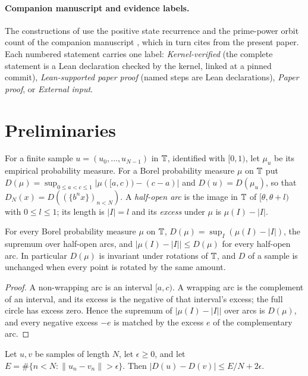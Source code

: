 \documentclass[11pt]{article}
\newcommand{\dist}[1]{\lVert #1\rVert}
\newcommand{\fr}[1]{\{#1\}}
\begin{document}
\paragraph{Companion manuscript and evidence labels.}
The constructions of  use the positive state recurrence and the prime-power
orbit count of the companion manuscript \cite{CompanionC}, which in turn cites 
from the present paper. Each numbered statement carries one label: \emph{Kernel-verified} (the
complete statement is a Lean declaration checked by the kernel, linked at a pinned commit),
\emph{Lean-supported paper proof} (named steps are Lean declarations), \emph{Paper proof}, or
\emph{External input}.

\section{Preliminaries}\label{sec:prelim}

For a finite sample $u=(u_0,\ldots,u_{N-1})$ in $\mathbb T$, identified with $[0,1)$, let $\mu_u$ be its
empirical probability measure. For a Borel probability measure $\mu$ on $\mathbb T$ put
$D(\mu)=\sup_{0\le a<c\le1}|\mu([a,c))-(c-a)|$ and $D(u)=D(\mu_u)$, so that
$D_N(x)=D((\fr{b^nx})_{n<N})$. A \emph{half-open arc} is the image in $\mathbb T$ of $[\theta,\theta+l)$ with
$0\le l\le1$; its length is $|I|=l$ and its \emph{excess} under $\mu$ is $\mu(I)-|I|$.

\begin{lemma}[Arcs]\label{lem:arcs}
For every Borel probability measure $\mu$ on $\mathbb T$, $D(\mu)=\sup_I(\mu(I)-|I|)$, the supremum over
half-open arcs, and $|\mu(I)-|I||\le D(\mu)$ for every half-open arc. In particular $D(\mu)$ is
invariant under rotations of $\mathbb T$, and $D$ of a sample is unchanged when every point is rotated by
the same amount.
\end{lemma}

\begin{proof}
A non-wrapping arc is an interval $[a,c)$. A wrapping arc is the complement of an interval, and its
excess is the negative of that interval's excess; the full circle has excess zero. Hence the
supremum of $|\mu(I)-|I||$ over arcs is $D(\mu)$, and every negative excess $-e$ is matched by the
excess $e$ of the complementary arc.
\end{proof}

\begin{lemma}\label{lem:compare}
Let $u,v$ be samples of length $N$, let $\epsilon\ge0$, and let
$E=\#\{n<N:\dist{u_n-v_n}>\epsilon\}$. Then $|D(u)-D(v)|\le E/N+2\epsilon$.
\end{lemma}
\end{document}
